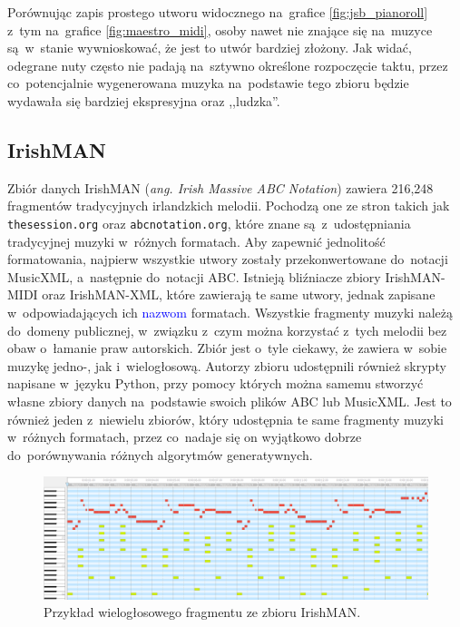 \documentclass[data-science]{agh-wi} %
\begin{document}
Porównując zapis prostego utworu widocznego na~grafice \ref*{fig:jsb_pianoroll} z~tym na~grafice \ref*{fig:maestro_midi}, osoby nawet nie znające się na~muzyce są~w~stanie wywnioskować, że jest to utwór bardziej złożony. Jak widać, odegrane nuty często nie padają na~sztywno określone rozpoczęcie taktu, przez co~potencjalnie wygenerowana muzyka na~podstawie tego zbioru będzie wydawała się bardziej ekspresyjna oraz ,,ludzka''.

\subsection{IrishMAN}
Zbiór danych IrishMAN (\textit{ang. Irish Massive ABC Notation}) \cite{irishman} zawiera 216,248 fragmentów tradycyjnych irlandzkich melodii. Pochodzą one ze stron takich jak \texttt{thesession.org} oraz \texttt{abcnotation.org}, które znane są~z~udostępniania tradycyjnej muzyki w~różnych formatach. Aby zapewnić jednolitość formatowania, najpierw wszystkie utwory zostały przekonwertowane do~notacji MusicXML, a~następnie do~notacji ABC. Istnieją bliźniacze zbiory IrishMAN-MIDI oraz IrishMAN-XML, które zawierają te same utwory, jednak zapisane w~odpowiadających ich \textcolor{blue}{nazwom} formatach. Wszystkie fragmenty muzyki należą do~domeny publicznej, w~związku z~czym można korzystać z~tych melodii bez obaw o~łamanie praw autorskich. Zbiór jest o~tyle ciekawy, że zawiera w~sobie muzykę jedno-, jak i~wielogłosową. Autorzy zbioru udostępnili również skrypty napisane w~języku Python, przy pomocy których można samemu stworzyć własne zbiory danych na~podstawie swoich plików ABC lub MusicXML. Jest to również jeden z~niewielu zbiorów, który udostępnia te same fragmenty muzyki w~różnych formatach, przez co~nadaje się on wyjątkowo dobrze do~porównywania różnych algorytmów generatywnych.

\begin{figure}[ht!]
    \begin{center}
        \includegraphics[width=0.9\linewidth]{./img/irishman_midi.png}
    \end{center}
    \caption{Przykład wielogłosowego fragmentu ze zbioru IrishMAN.}\label{fig:irish_midi}
\end{figure}
\end{document}
